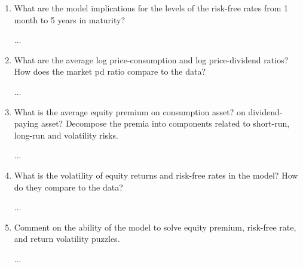 \documentclass{article}
\begin{document}
\begin{enumerate}
...

\item  What are the model implications for the levels of the risk-free rates from 1 month to 5 years in maturity?

...

\item  What are the average log price-consumption and log price-dividend ratios? How does the market pd ratio compare to the data?

...

\item What is the average equity premium on consumption asset? on dividend-paying asset? Decompose the premia into components related to short-run, long-run and volatility risks.

...

\item  What is the volatility of equity returns and risk-free rates in the model? How do they compare to the data?

...

\item  Comment on the ability of the model to solve equity premium, risk-free rate, and return volatility puzzles.

...

\end{enumerate}
\end{document}
